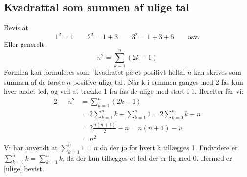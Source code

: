 \subsection{Kvadrattal som summen af ulige tal}
Bevis at \[1^2=1 \qquad  2^2=1+3 \qquad 3^2=1+3+5 \qquad \text{osv.}\]
Eller generelt:
\begin{equation}
n^2=\sum_{k=1}^{n}(2k-1)\label{ulige}
\end{equation}
Formlen kan formuleres som: 'kvadratet på et positivt heltal \(n\) kan skrives som summen af de første \(n\) positive ulige tal'.
Når k i summen ganges med 2 fås kun hver andet led, og ved at trække 1 fra fås de ulige med start i 1. Herefter får vi:
\begin{alignat*}{2}
&&n^2&=\sum_{k=1}^{n}(2k-1)\\
&&&=2\sum_{k=1}^{n}k-\sum_{k=1}^{n}1=2\sum_{k=0}^{n}k-n\\
&&&=2\frac{n(n+1)}{2}-n=n(n+1)-n\\
&&&=n^2
\end{alignat*}
Vi har anvendt at \(\sum_{k=1}^{n}1=n\) da der jo for hvert k tillægges 1. Endvidere er \(\sum_{k=0}^{n}k=\sum_{k=1}^{n}k\), da der kun tillægges et led der er lig med 0.
Hermed er \ref{ulige} bevist.

